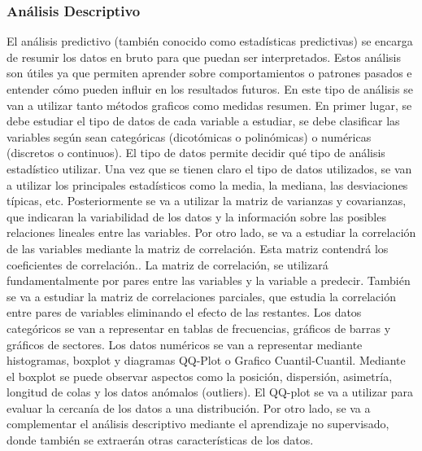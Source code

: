 \documentclass[spanish,12pt, a4paper,twoside]{paper}
\begin{document}
\subsubsection{Análisis Descriptivo}
\justify
El análisis predictivo (también conocido como estadísticas predictivas) se encarga de resumir los datos en bruto para que puedan ser interpretados. Estos análisis son útiles ya que permiten aprender sobre comportamientos o patrones pasados e entender cómo pueden influir en los resultados futuros. En este tipo de análisis se van a utilizar tanto métodos graficos como medidas resumen.
\justify
En primer lugar, se debe estudiar el tipo de datos de cada variable a estudiar, se debe clasificar las variables según sean categóricas (dicotómicas o polinómicas) o numéricas (discretos o continuos). El tipo de datos permite decidir qué tipo de análisis estadístico utilizar.
Una vez que se tienen claro el tipo de datos utilizados, se van a utilizar los principales estadísticos como la media, la mediana, las desviaciones típicas, etc.
Posteriormente se va a utilizar la matriz de varianzas y covarianzas, que indicaran la variabilidad de los datos y la información sobre las posibles relaciones lineales entre las variables. 
\justify
Por otro lado, se va a estudiar la correlación de las variables mediante la matriz de correlación. Esta matriz contendrá los coeficientes de correlación.\cite{JMMarin}. La matriz de correlación, se utilizará fundamentalmente por pares entre las variables y la variable a predecir.
\justify
También se va a estudiar la matriz de correlaciones parciales, que estudia la correlación entre pares de variables eliminando el efecto de las restantes.\cite{JMMarin}
\justify
Los datos categóricos se van a representar en tablas de frecuencias, gráficos de barras y gráficos de sectores. Los datos numéricos se van a representar mediante histogramas, boxplot y diagramas QQ-Plot o Grafico Cuantil-Cuantil. \cite{Orellana2001}
\justify
Mediante el boxplot se puede observar aspectos como la posición, dispersión, asimetría, longitud de colas y los datos anómalos (outliers). 
El QQ-plot se va a utilizar para evaluar la cercanía de los datos a una distribución. \cite{Orellana2001}
\justify
Por otro lado, se va a complementar el análisis descriptivo mediante el aprendizaje no supervisado, donde también se extraerán otras características de los datos.


\justify
\end{document}
